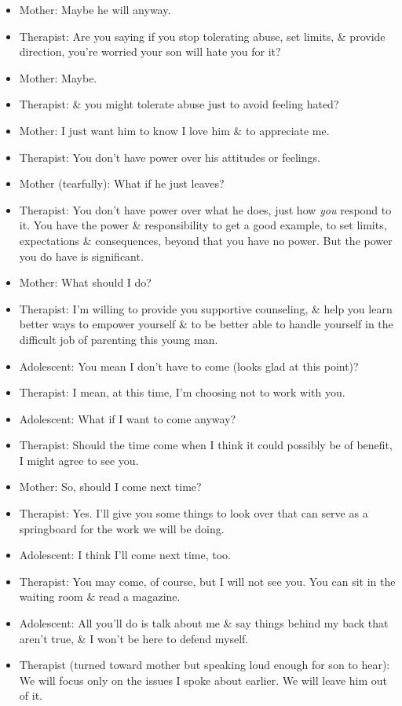 \documentclass{article}
\numberwithin{equation}{section}
\begin{document}
\begin{itemize}
	\item Mother: Maybe he will anyway.
	\item Therapist: Are you saying if you stop tolerating abuse, set limits, \& provide direction, you're worried your son will hate you for it?
	\item Mother: Maybe.
	\item Therapist: \& you might tolerate abuse just to avoid feeling hated?
	\item Mother: I just want him to know I love him \& to appreciate me.
	\item Therapist: You don't have power over his attitudes or feelings.
	\item Mother (tearfully): What if he just leaves?
	\item Therapist: You don't have power over what he does, just how \textit{you} respond to it. You have the power \& responsibility to get a good example, to set limits, expectations \& consequences, beyond that you have no power. But the power you do have is significant.
	\item Mother: What should I do? 
	\item Therapist: I'm willing to provide you supportive counseling, \& help you learn better ways to empower yourself \& to be better able to handle yourself in the difficult job of parenting this young man.
	\item Adolescent: You mean I don't have to come (looks glad at this point)?
	\item Therapist: I mean, at this time, I'm choosing not to work with you.
	\item Adolescent: What if I want to come anyway?
	\item Therapist: Should the time come when I think it could possibly be of benefit, I might agree to see you.
	\item Mother: So, should I come next time?
	\item Therapist: Yes. I'll give you some things to look over that can serve as a springboard for the work we will be doing.
	\item Adolescent: I think I'll come next time, too.
	\item Therapist: You may come, of course, but I will not see you. You can sit in the waiting room \& read a magazine.
	\item Adolescent: All you'll do is talk about me \& say things behind my back that aren't true, \& I won't be here to defend myself.
	\item Therapist (turned toward mother but speaking loud enough for son to hear): We will focus only on the issues I spoke about earlier. We will leave him out of it.
	

\end{itemize}
\end{document}
